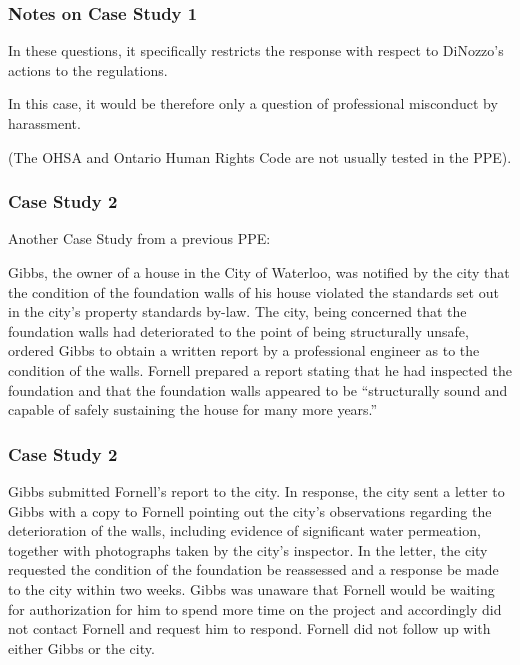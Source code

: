 \begin{frame}
\frametitle{Notes on Case Study 1}

In these questions, it specifically restricts the response with respect to DiNozzo's actions to the regulations.

In this case, it would be therefore only a question of professional misconduct by harassment.

 (The OHSA and Ontario Human Rights Code are not usually tested in the PPE).

\end{frame}



\begin{frame}
\frametitle{Case Study 2}

Another Case Study from a previous PPE:


Gibbs, the owner of a house in the City of Waterloo, was notified by the city that the condition of the foundation walls of his house violated the standards set out in the city's property standards by-law.  The city, being concerned that the foundation walls had deteriorated to the point of being structurally unsafe, ordered Gibbs to obtain a written report by a professional engineer as to the condition of the walls.  Fornell prepared a report stating that he had inspected the foundation and that the foundation walls appeared to be ``structurally sound and capable of safely sustaining the house for many more years.''


\end{frame}



\begin{frame}
\frametitle{Case Study 2}

Gibbs submitted Fornell's report to the city.  In response, the city sent a letter to Gibbs with a copy to Fornell pointing out the city's observations regarding the deterioration of the walls, including evidence of significant water permeation, together with photographs taken by the city's inspector. In the letter, the city requested the condition of the foundation be reassessed and a response be made to the city within two weeks. Gibbs was unaware that Fornell would be waiting for authorization for him to spend more time on the project and accordingly did not contact Fornell and request him to respond. Fornell did not follow up with either Gibbs or the city.

\end{frame}



